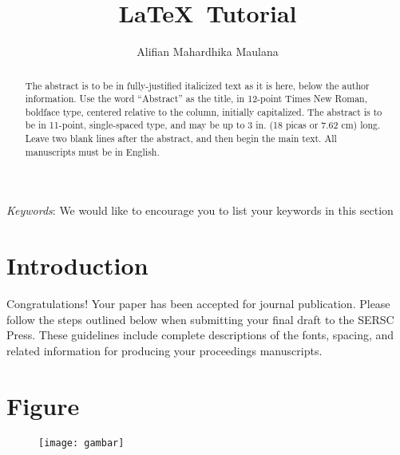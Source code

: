 \documentclass[11pt,a4paper]{article}
\begin{document}
\author[1]{Alifian Mahardhika Maulana}
\title{\LaTeX\ Tutorial}
\maketitle
\begin{abstract}
	The abstract is to be in fully-justified italicized text as it is here, below the author information. Use the word “Abstract” as the title, in 12-point Times New Roman, boldface type, centered relative to the column, initially capitalized. The abstract is to be in 11-point, single-spaced type, and may be up to 3 in. (18 picas or 7.62 cm) long. Leave two blank lines after the abstract, and then begin the main text. All manuscripts must be in English.
\end{abstract}
\textit{Keywords}: We would like to encourage you to list your keywords in this section
\section{Introduction}
	Congratulations! Your paper has been accepted for journal publication. Please follow the steps outlined below when submitting your final draft to the SERSC Press. These guidelines include complete descriptions of the fonts, spacing, and related information for producing your proceedings manuscripts.
\section{Figure}
\begin{figure}
	\centering
	\texttt{[image: gambar]}
\end{figure}
\end{document}
